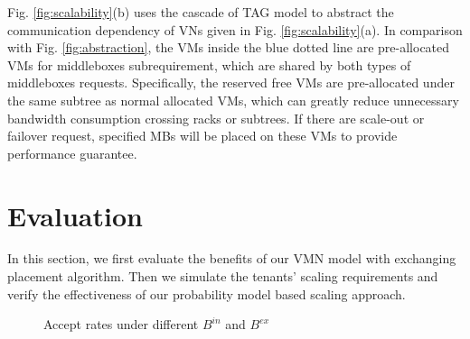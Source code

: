 \documentclass[review]{elsarticle}
\begin{document}
Fig. \ref{fig:scalability}(b) uses the cascade of TAG model to abstract the communication dependency of VNs given in Fig. \ref{fig:scalability}(a). In comparison with Fig. \ref{fig:abstraction}, the VMs inside the blue dotted line are pre-allocated VMs for middleboxes subrequirement, which are shared by both types of middleboxes requests.
Specifically, the reserved free VMs are pre-allocated under the same subtree as normal allocated VMs, which can greatly reduce unnecessary  bandwidth consumption crossing racks or subtrees. If there are scale-out or failover request, specified MBs will be placed on these VMs to provide performance guarantee. %




\section{Evaluation}\label{sec:simulation}

In this section, we first evaluate the benefits of our VMN model with exchanging placement algorithm. Then we simulate the tenants' scaling requirements and verify the effectiveness of our probability model based scaling approach.

\begin{figure}
	\centering
	
	\caption{Accept rates under different $B^{in}$ and $ B^{ex}$}
	\label{fig:accept_rate}
\end{figure}
\end{document}

